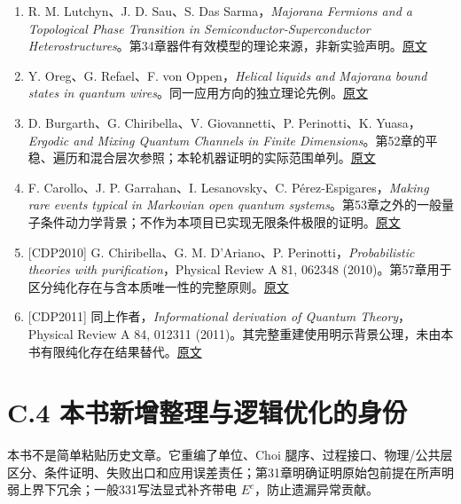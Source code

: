 \documentclass[
  11pt,
  oneside]{book}
\begin{document}
\begin{enumerate}
  R. Foot 等，\emph{SU(3)L⊗U(1)N and SU(4)L⊗U(1)N gauge models with
  right-handed
  neutrinos}，1994。用于331RHN类的先例定位。\href{https://link.aps.org/doi/10.1103/PhysRevD.50.R34}{原论文}
\item
  R. M. Lutchyn、J. D. Sau、S. Das Sarma，\emph{Majorana Fermions and a
  Topological Phase Transition in Semiconductor-Superconductor
  Heterostructures}。第34章器件有效模型的理论来源，非新实验声明。\href{https://arxiv.org/abs/1002.4033}{原文}
\item
  Y. Oreg、G. Refael、F. von Oppen，\emph{Helical liquids and Majorana
  bound states in quantum
  wires}。同一应用方向的独立理论先例。\href{https://arxiv.org/abs/1003.1145}{原文}
\item
  D. Burgarth、G. Chiribella、V. Giovannetti、P. Perinotti、K.
  Yuasa，\emph{Ergodic and Mixing Quantum Channels in Finite
  Dimensions}。第52章的平稳、遍历和混合层次参照；本轮机器证明的实际范围单列。\href{https://arxiv.org/abs/1210.5625}{原文}
\item
  F. Carollo、J. P. Garrahan、I. Lesanovsky、C.
  Pérez-Espigares，\emph{Making rare events typical in Markovian open
  quantum
  systems}。第53章之外的一般量子条件动力学背景；不作为本项目已实现无限条件极限的证明。\href{https://arxiv.org/abs/1711.10951}{原文}
\item
  {[}CDP2010{]} G. Chiribella、G. M. D'Ariano、P.
  Perinotti，\emph{Probabilistic theories with purification}，Physical
  Review A 81, 062348
  (2010)。第57章用于区分纯化存在与含本质唯一性的完整原则。\href{https://arxiv.org/abs/0908.1583}{原文}
\item
  {[}CDP2011{]} 同上作者，\emph{Informational derivation of Quantum
  Theory}，Physical Review A 84, 012311
  (2011)。其完整重建使用明示背景公理，未由本书有限纯化存在结果替代。\href{https://arxiv.org/abs/1011.6451}{原文}
\end{enumerate}

\hypertarget{c.4-ux672cux4e66ux65b0ux589eux6574ux7406ux4e0eux903bux8f91ux4f18ux5316ux7684ux8eabux4efd}{%
\section{C.4
本书新增整理与逻辑优化的身份}\label{c.4-ux672cux4e66ux65b0ux589eux6574ux7406ux4e0eux903bux8f91ux4f18ux5316ux7684ux8eabux4efd}}

本书不是简单粘贴历史文章。它重编了单位、Choi
腿序、过程接口、物理/公共层区分、条件证明、失败出口和应用误差责任；第31章明确证明原始包前提在所声明弱上界下冗余；一般331写法显式补齐带电
\(E^c\)，防止遗漏异常贡献。
\end{document}
